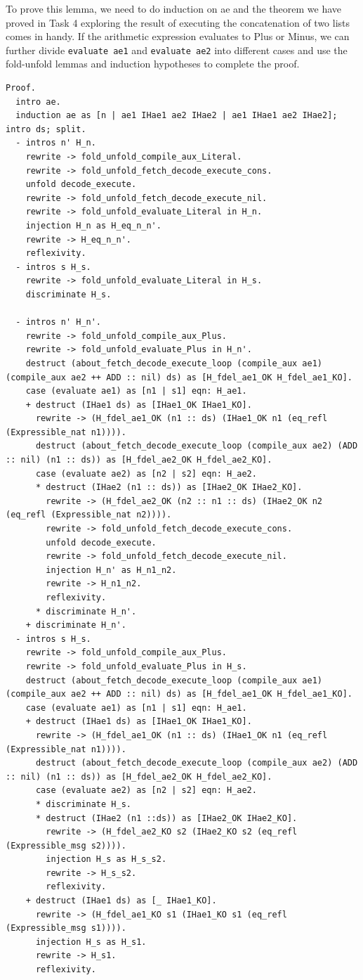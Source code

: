 \documentclass{article}
\begin{document}
To prove this lemma, we need to do induction on ae and the theorem we have proved in Task 4 exploring the result of executing the concatenation of two lists comes in handy. If the arithmetic expression evaluates to Plus or Minus, we can further divide \texttt{evaluate ae1} and \texttt{evaluate ae2} into different cases and use the fold-unfold lemmas and induction hypotheses to complete the proof.
\begin{lstlisting}
Proof.
  intro ae.
  induction ae as [n | ae1 IHae1 ae2 IHae2 | ae1 IHae1 ae2 IHae2]; intro ds; split.
  - intros n' H_n.
    rewrite -> fold_unfold_compile_aux_Literal.
    rewrite -> fold_unfold_fetch_decode_execute_cons.
    unfold decode_execute.   
    rewrite -> fold_unfold_fetch_decode_execute_nil.
    rewrite -> fold_unfold_evaluate_Literal in H_n.
    injection H_n as H_eq_n_n'.
    rewrite -> H_eq_n_n'.
    reflexivity.
  - intros s H_s.
    rewrite -> fold_unfold_evaluate_Literal in H_s.
    discriminate H_s.
    
  - intros n' H_n'.
    rewrite -> fold_unfold_compile_aux_Plus.
    rewrite -> fold_unfold_evaluate_Plus in H_n'.
    destruct (about_fetch_decode_execute_loop (compile_aux ae1) (compile_aux ae2 ++ ADD :: nil) ds) as [H_fdel_ae1_OK H_fdel_ae1_KO].
    case (evaluate ae1) as [n1 | s1] eqn: H_ae1.
    + destruct (IHae1 ds) as [IHae1_OK IHae1_KO].
      rewrite -> (H_fdel_ae1_OK (n1 :: ds) (IHae1_OK n1 (eq_refl (Expressible_nat n1)))).
      destruct (about_fetch_decode_execute_loop (compile_aux ae2) (ADD :: nil) (n1 :: ds)) as [H_fdel_ae2_OK H_fdel_ae2_KO].
      case (evaluate ae2) as [n2 | s2] eqn: H_ae2.
      * destruct (IHae2 (n1 :: ds)) as [IHae2_OK IHae2_KO].
        rewrite -> (H_fdel_ae2_OK (n2 :: n1 :: ds) (IHae2_OK n2 (eq_refl (Expressible_nat n2)))).
        rewrite -> fold_unfold_fetch_decode_execute_cons.
        unfold decode_execute.
        rewrite -> fold_unfold_fetch_decode_execute_nil.
        injection H_n' as H_n1_n2.
        rewrite -> H_n1_n2.
        reflexivity.
      * discriminate H_n'.
    + discriminate H_n'.
  - intros s H_s.
    rewrite -> fold_unfold_compile_aux_Plus.
    rewrite -> fold_unfold_evaluate_Plus in H_s.
    destruct (about_fetch_decode_execute_loop (compile_aux ae1) (compile_aux ae2 ++ ADD :: nil) ds) as [H_fdel_ae1_OK H_fdel_ae1_KO].
    case (evaluate ae1) as [n1 | s1] eqn: H_ae1.
    + destruct (IHae1 ds) as [IHae1_OK IHae1_KO].
      rewrite -> (H_fdel_ae1_OK (n1 :: ds) (IHae1_OK n1 (eq_refl (Expressible_nat n1)))).
      destruct (about_fetch_decode_execute_loop (compile_aux ae2) (ADD :: nil) (n1 :: ds)) as [H_fdel_ae2_OK H_fdel_ae2_KO].
      case (evaluate ae2) as [n2 | s2] eqn: H_ae2.
      * discriminate H_s.
      * destruct (IHae2 (n1 ::ds)) as [IHae2_OK IHae2_KO].
        rewrite -> (H_fdel_ae2_KO s2 (IHae2_KO s2 (eq_refl (Expressible_msg s2)))).
        injection H_s as H_s_s2.
        rewrite -> H_s_s2.
        reflexivity.        
    + destruct (IHae1 ds) as [_ IHae1_KO].
      rewrite -> (H_fdel_ae1_KO s1 (IHae1_KO s1 (eq_refl (Expressible_msg s1)))).
      injection H_s as H_s1.
      rewrite -> H_s1.
      reflexivity.
      

\end{lstlisting}
\end{document}
